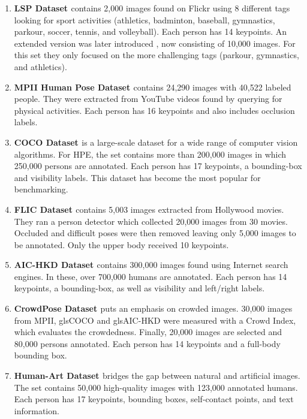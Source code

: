 \begin{enumerate}
	\item \textbf{\gls{LSP} Dataset \cite{Johnson2010}} contains 2,000 images found on Flickr using 8 different tags looking for sport activities (athletics, badminton, baseball, gymnastics, parkour, soccer, tennis, and volleyball).
	Each person has 14 keypoints.
	An extended version was later introduced \cite{Johnson2011}, now consisting of 10,000 images. 
	For this set they only focused on the more challenging tags (parkour, gymnastics, and athletics).
	\item \textbf{\gls{MPII} Human Pose Dataset \cite{Andriluka2014}} contains 24,290 images with 40,522 labeled people.
	They were extracted from YouTube videos found by querying for physical activities.
	Each person has 16 keypoints and also includes occlusion labels.
	\item \textbf{\gls{COCO} Dataset \cite{Lin2014}} is a large-scale dataset for a wide range of computer vision algorithms.
	For \gls{HPE}, the set contains more than 200,000 images in which 250,000 persons are annotated.
	Each person has 17 keypoints, a bounding-box and visibility labels.
	This dataset has become the most popular for benchmarking.
	\item \textbf{\gls{FLIC} Dataset \cite{Sap2013}} contains 5,003 images extracted from Hollywood movies.
	They ran a person detector which collected 20,000 images from 30 movies.
	Occluded and difficult poses were then removed leaving only 5,000 images to be annotated.
	Only the upper body received 10 keypoints.
	\item \textbf{\gls{AIC-HKD} Dataset \cite{Sap2013}} contains 300,000 images found using Internet search engines.
	In these, over 700,000 humans are annotated.
	Each person has 14 keypoints, a bounding-box, as well as visibility and left/right labels.
	\item \textbf{CrowdPose Dataset \cite{Li2018}} puts an emphasis on crowded images.
	30,000 images from \gls{MPII}, gls{COCO} and gls{AIC-HKD} were measured with a Crowd Index, which evaluates the crowdedness.
	Finally, 20,000 images are selected and 80,000 persons annotated.
	Each person has 14 keypoints and a full-body bounding box.
	\item \textbf{Human-Art Dataset \cite{Ju2023}} bridges the gap between natural and artificial images.
	The set contains 50,000 high-quality images with 123,000 annotated humans.
	Each person has 17 keypoints, bounding boxes, self-contact points, and text information.
\end{enumerate}

